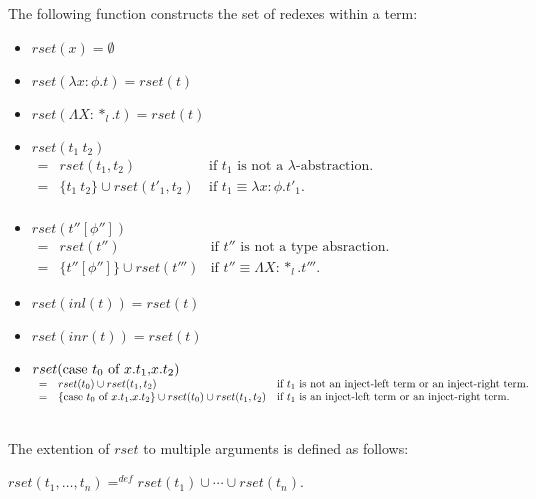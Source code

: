 \begin{definition}
  \label{def:rset_ssfp}
  The following function constructs the set of redexes within a term:

  \begin{center}
    \begin{itemize}
    \item[] $rset(x) = \emptyset$\\
    \item[] $rset(\lambda x:\phi.t) = rset(t)$\\
    \item[] $rset(\Lambda X:*_l.t) = rset(t)$\\
    \item[] $rset(t_1\ t_2)$\\
      \begin{math}
        \begin{array}{lll}
          = & rset(t_1, t_2) & \text{if } t_1 \text{ is not a } \lambda \text{-abstraction.}\\
          = & \{t_1\ t_2\} \cup rset(t'_1, t_2)\ & \text{if } t_1 \equiv \lambda x:\phi.t'_1.\\
        \end{array}
      \end{math}
    \item[] $rset(t''[\phi''])$\\
      \begin{math}
        \begin{array}{lll}
          = & rset(t'') & \text{if } t'' \text{ is not a type absraction.}\\
          = & \{t''[\phi'']\} \cup rset(t''') & \text{if } t'' \equiv \Lambda X:*_l.t'''.
        \end{array}
      \end{math}
    \item[] $rset(inl(t)) = rset(t)$\\
    \item[] $rset(inr(t)) = rset(t)$\\
    \item[] $rset(\mbox{case}\ t_0\ \text{of}\ x\text{.}t_1\text{,}x\text{.}t_2)$\\
      \begin{math}
        \begin{array}{lll}
          = & rset(t_0) \cup rset(t_1,t_2) & \text{if } t_1 \text{ is not an inject-left term 
            or an inject-right term.}\\
          = & \{\mbox{case}\ t_0\ \text{of}\ x\text{.}t_1\text{,}x\text{.}t_2\} \cup rset(t_0) \cup rset(t_1,t_2) & \text{if } t_1 
          \text{ is an inject-left term or an inject-right term.}
        \end{array}
      \end{math}
    \end{itemize}
  \end{center}
  \ \\
  The extention of $rset$ to multiple arguments is defined as follows:
  \begin{center}
    $rset(t_1, \ldots, t_n) =^{def} rset(t_1) \cup \cdots \cup rset(t_n)$.
  \end{center}
\end{definition}

